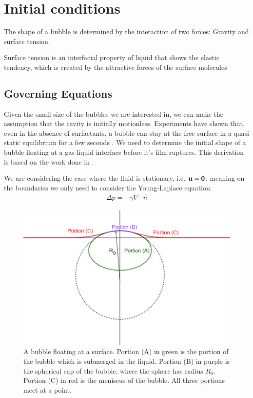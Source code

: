\section{Initial conditions}
The shape of a bubble is determined by the interaction of two forces: Gravity and surface tension.

Surface tension is an interfacial property of liquid that shows the elastic tendency, which is created by the attractive forces of the surface molecules



\subsection{Governing Equations}
Given the small size of the bubbles we are interested in, we can make the assumption that the cavity is initially motionless. Experiments have shown that, even in the absence of surfactants, a bubble can stay at the free surface in a quasi static equilibrium for a few seconds \cite{blanchard1988film}.
We need to determine the initial shape of a bubble floating at a gas-liquid interface before it's film ruptures. This derivation is based on the work done in \cite{toba1959drop}.

We are considering the case where the fluid is stationary, i.e. $\bf{u} = \bf{0}$, meaning on the boundaries we only need to consider the Young-Laplace equation:
\begin{align}
    \Delta p=-\gamma \nabla \cdot \hat n
\end{align}

\begin{figure}
    \centering
    \includegraphics[width=0.7\linewidth]{WriteUp/images/bubble at surface.png}
    \caption{A bubble floating at a surface. Portion (A) in green is the portion of the bubble which is submerged in the liquid. Portion (B) in purple is the spherical cap of the bubble, where the sphere has radius $R_0$. Portion (C) in red is the meniscus of the bubble. All three portions meet at a point.}
    \label{fig:2}
\end{figure}

